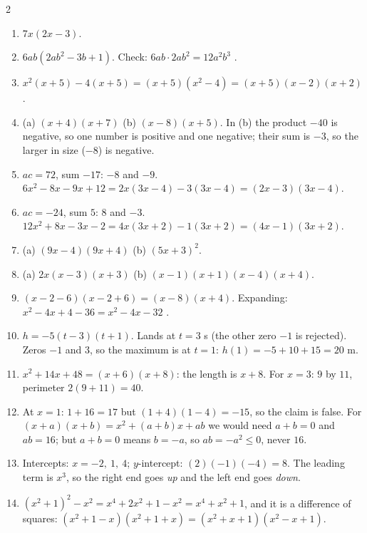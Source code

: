 \documentclass[11pt]{article}
\begin{document}
\begin{keybox}
\begin{multicols}{2}
\small
\begin{enumerate}[leftmargin=*,itemsep=3pt]
  \item $7x(2x - 3)$.
  \item $6ab(2ab^2-3b+1)$. Check: $6ab\cdot2ab^2=12a^2b^3$ \checkmark.
  \item $x^2(x+5)-4(x+5)=(x+5)(x^2-4)=(x + 5)(x - 2)(x + 2)$.
  \item (a) $(x + 4)(x + 7)$ \quad (b) $(x - 8)(x + 5)$. In (b) the product $-40$ is negative, so one number is positive and one negative; their sum is $-3$, so the larger in size ($-8$) is negative.
  \item $ac=72$, sum $-17$: $-8$ and $-9$. $6x^2-8x-9x+12=2x(3x-4)-3(3x-4)=(2x - 3)(3x - 4)$.
  \item $ac=-24$, sum $5$: $8$ and $-3$. $12x^2+8x-3x-2=4x(3x+2)-1(3x+2)=(4x - 1)(3x + 2)$.
  \item (a) $(9x - 4)(9x + 4)$ \quad (b) $(5x + 3)^2$.
  \item (a) $2x(x - 3)(x + 3)$ \quad (b) $(x - 1)(x + 1)(x - 4)(x + 4)$.
  \item $(x-2-6)(x-2+6)=(x - 8)(x + 4)$. Expanding: $x^2-4x+4-36=x^2-4x-32$ \checkmark.
  \item $h=-5(t - 3)(t + 1)$. Lands at $t=3$ s (the other zero $-1$ is rejected). Zeros $-1$ and $3$, so the maximum is at $t=1$: $h(1)=-5+10+15=20$ m.
  \item $x^2+14x+48=(x+6)(x+8)$: the length is $x+8$. For $x=3$: $9$ by $11$, perimeter $2(9+11)=40$.
  \item At $x=1$: $1+16=17$ but $(1+4)(1-4)=-15$, so the claim is false. For $(x+a)(x+b)=x^2+(a+b)x+ab$ we would need $a+b=0$ and $ab=16$; but $a+b=0$ means $b=-a$, so $ab=-a^2\le0$, never $16$.
  \item Intercepts: $x=-2,\ 1,\ 4$; $y$-intercept: $(2)(-1)(-4)=8$. The leading term is $x^3$, so the right end goes \emph{up} and the left end goes \emph{down}.
  \item $(x^2+1)^2-x^2=x^4+2x^2+1-x^2=x^4+x^2+1$, and it is a difference of squares: $(x^2+1-x)(x^2+1+x)=(x^2 + x + 1)(x^2 - x + 1)$.
\end{enumerate}
\end{multicols}
\end{keybox}
\end{document}
